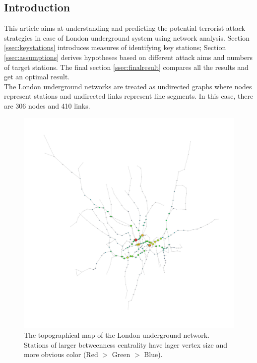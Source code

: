 \documentclass[a4paper,reqno,]{article}
\begin{document}
\subsection{Introduction}
This article aims at understanding and predicting the potential terrorist attack strategies in case of London underground system using network analysis. Section \ref{ssec:keystations} introduces measures of identifying key stations; Section \ref{ssec:assumptions} derives hypotheses based on different attack aims and numbers of target stations. The final section \ref{ssec:finalresult} compares all the results and get an optimal result.
\\The London underground networks are treated as undirected graphs where nodes represent stations and undirected links represent line segments. In this case, there are 306 nodes and 410 links.
\begin{figure}[h]
\centering
\begin{minipage}[b]{0.49\textwidth}
\centering
    \captionsetup{width=.9\linewidth}
    \includegraphics[clip, trim=3cm 3cm 0.25cm 2cm,width=1\textwidth]{images/NW/london_map_w.pdf}
    \caption{The topographical map of the London underground network. Stations of larger betweenness centrality have lager vertex size and more obvious color (Red $>$ Green $>$ Blue). }\label{fig:london_1}
\end{minipage}

\end{figure}
\end{document}
